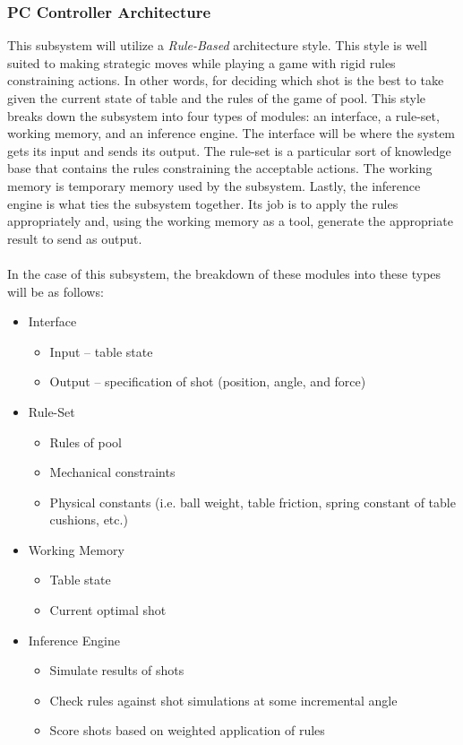 \documentclass[titlepage]{article}
\begin{document}
\subsubsection{PC Controller Architecture}
This subsystem will utilize a \textit{Rule-Based} architecture style. This style is well suited to making strategic moves while playing a game with rigid rules constraining actions. In other words, for deciding which shot is the best to take given the current state of table and the rules of the game of pool. This style breaks down the subsystem into four types of modules: an interface, a rule-set,  working memory, and an inference engine. The interface will be where the system gets its input and sends its output. The rule-set is a particular sort of knowledge base that contains the rules constraining the acceptable actions. The working memory is temporary memory used by the subsystem. Lastly, the inference engine is what ties the subsystem together. Its job is to apply the rules appropriately and, using the working memory as a tool, generate the appropriate result to send as output.\\~\\
In the case of this subsystem, the breakdown of these modules into these types will be as follows:
\begin{itemize}
	\item Interface
	\begin{itemize}
		\item Input -- table state
		\item Output -- specification of shot (position, angle, and force)
	\end{itemize}
	\item Rule-Set
	\begin{itemize}
		\item Rules of pool
		\item Mechanical constraints
		\item Physical constants (i.e. ball weight, table friction, spring constant of table cushions, etc.)
	\end{itemize}
	\item Working Memory
	\begin{itemize}
		\item Table state
		\item Current optimal shot
	\end{itemize}
	\item Inference Engine
	\begin{itemize}
		\item Simulate results of shots
		\item Check rules against shot simulations at some incremental angle
		\item Score shots based on weighted application of rules
	\end{itemize}
\end{itemize}
\end{document}
